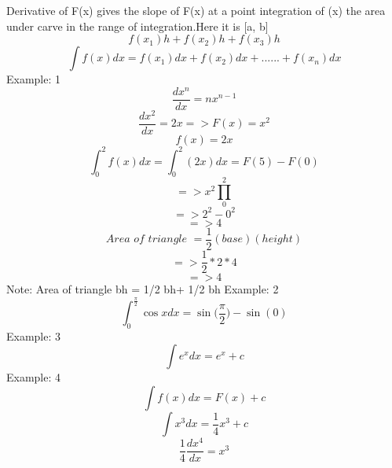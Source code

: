 Derivative of F(x) gives the slope of F(x) at a point integration of (x) the area under carve in the range of integration.Here it is [a, b]
\newline
\begin{equation}
f(x_1)h+f(x_2)h+f(x_3)h
\end{equation}
\begin{equation}
\int f(x)dx=f(x_1)dx+f(x_2)dx+......+f(x_n)dx
\end{equation}
Example: 1
\begin{equation}
\frac{dx^n}{dx} = nx^{n-1}
\end{equation}
\begin{equation}
\frac{dx^2}{dx} = 2x => F(x)=x^2
\end{equation}
\begin{displaymath}
f(x) = 2x
\end{displaymath}
\begin{displaymath}
\int_{0}^{2}f(x)dx=\int_{0}^{2}(2x)dx = F(5)-F(0)
\end{displaymath}
\begin{displaymath}
=> x^2\prod_{0}^{2}
\end{displaymath}
\begin{displaymath}
=>2^2-0^2
\end{displaymath}
\begin{displaymath}
=>4
\end{displaymath}
\newline
\begin{equation}
Area \,\, of \,\, triangle\,\, = \frac{1}{2}(base)(height)
\end{equation}
\begin{displaymath}
=>\frac{1}{2}*2*4
\end{displaymath}
\begin{displaymath}
=> 4
\end{displaymath}
Note: Area of triangle bh = 1/2 bh+ 1/2 bh
\newline
Example: 2
\begin{equation}
\int_{0}^{\frac{\pi}{2}}\cos xdx = \sin\big(\frac{\pi}{2}\big) - \sin(0)
\end{equation}
Example: 3
\begin{equation}
\int e^x dx = e^x+c
\end{equation}
Example: 4
\begin{equation}
\int f(x)dx=F(x)+c
\end{equation}
\begin{equation}
\int x^3 dx = \frac{1}{4}x^3+c	
\end{equation}
\begin{displaymath}
\frac{1}{4}\frac{dx^4}{dx} = x^3
\end{displaymath}

